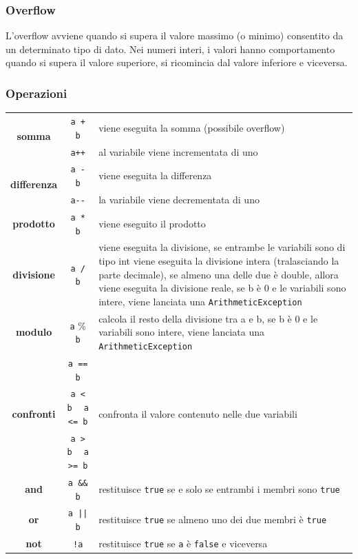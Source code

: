 \documentclass[a4paper]{article}
\begin{document}
\subsubsection*{Overflow}
L'overflow avviene quando si supera il valore massimo (o minimo) consentito da un determinato tipo di dato. Nei numeri
interi, i valori hanno comportamento  quando si supera il valore superiore, si ricomincia dal valore inferiore 
e viceversa.

\subsubsection*{Operazioni}
\begin{center}
	\begin{tabularx}{\textwidth}{c c X}		
		\multirow{2}{*}{\textbf{somma}}
		& \verb|a + b| & viene eseguita la somma (possibile overflow) \\
		& \verb|a++| & al variabile viene incrementata di uno \\
		\midrule

		\multirow{2}{*}{\textbf{differenza}}
		& \verb|a - b| & viene eseguita la differenza \\
		& \verb|a--| & la variabile viene decrementata di uno \\
		\midrule
		
		\textbf{prodotto}
		& \verb|a * b| & viene eseguito il prodotto \\
		\midrule
		
		\textbf{divisione}
		& \verb|a / b| & viene eseguita la divisione, se entrambe le variabili sono di tipo int viene eseguita la divisione
		intera (tralasciando la parte decimale), se almeno una delle due è double, allora viene eseguita la divisione reale,
		se b è 0 e le variabili sono intere, viene lanciata una \verb|ArithmeticException| \\
		\midrule
		
		\textbf{modulo}
		& \verb|a| \% \verb|b| & calcola il resto della divisione tra a e b, se b è 0 e le variabili sono intere, viene
		lanciata una \verb|ArithmeticException| \\
		\midrule
		
		\multirow{3}{*}{\textbf{confronti}}
		& \verb|a == b| & \multirow{3}{*}{confronta il valore contenuto nelle due variabili} \\
		& \verb|a < b| \(\;\;\) \verb|a <= b| & \\
		& \verb|a > b| \(\;\;\) \verb|a >= b| & \\
		\midrule

		\textbf{and}
		& \verb|a && b| & restituisce \verb|true| se e solo se entrambi i membri sono \verb|true| \\
		\midrule

		\textbf{or}
		& \verb=a || b= & restituisce \verb|true| se almeno uno dei due membri è \verb|true| \\
		\midrule

		\textbf{not}
		& \verb|!a| & restituisce \verb|true| se \verb|a| è \verb|false| e viceversa
	\end{tabularx}
\end{center}
\end{document}

